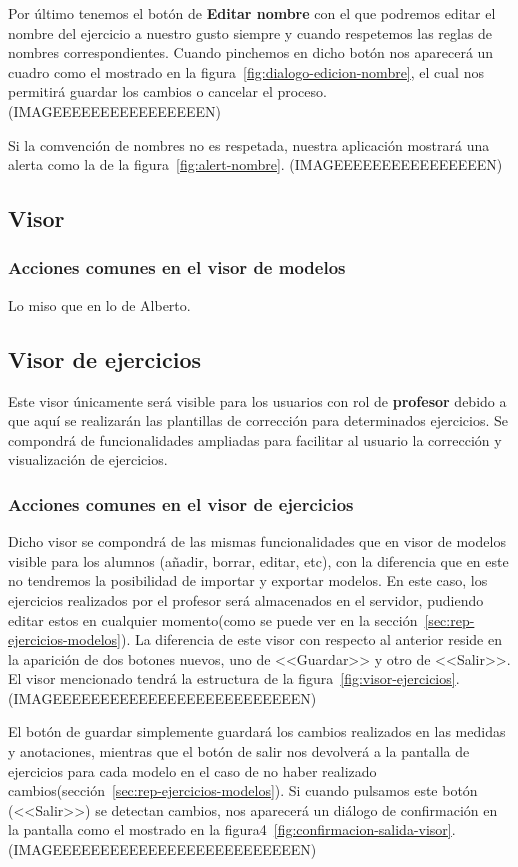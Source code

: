 Por último tenemos el botón de \textbf{Editar nombre} con el que podremos editar el nombre del ejercicio a nuestro gusto siempre y cuando respetemos las reglas de nombres correspondientes. Cuando pinchemos en dicho botón nos aparecerá un cuadro como el mostrado en la figura~\ref{fig:dialogo-edicion-nombre}, el cual nos permitirá guardar los cambios o cancelar el proceso.
(IMAGEEEEEEEEEEEEEEEEN)

Si la comvención de nombres no es respetada, nuestra aplicación mostrará una alerta como la de la figura~\ref{fig:alert-nombre}.
(IMAGEEEEEEEEEEEEEEEEN)

\subsection{Visor}
\subsubsection{Acciones comunes en el visor de modelos}
Lo miso que en lo de Alberto.

\subsection{Visor de ejercicios}\label{sec:visor-ejercicios}
Este visor únicamente será visible para los usuarios con rol de \textbf{profesor} debido a que aquí se realizarán las plantillas de corrección para determinados ejercicios. Se compondrá de funcionalidades ampliadas para facilitar al usuario la corrección y visualización de ejercicios.

\subsubsection{Acciones comunes en el visor de ejercicios}
Dicho visor se compondrá de las mismas funcionalidades que en visor de modelos visible para los alumnos (añadir, borrar, editar, etc), con la diferencia que en este no tendremos la posibilidad de importar y exportar modelos. En este caso, los ejercicios realizados por el profesor será almacenados en el servidor, pudiendo editar estos en cualquier momento(como se puede ver en la sección~\ref{sec:rep-ejercicios-modelos}). La diferencia de este visor con respecto al anterior reside en la aparición de dos botones nuevos, uno de <<Guardar>> y otro de <<Salir>>. El visor mencionado tendrá la estructura de la figura~\ref{fig:visor-ejercicios}.
(IMAGEEEEEEEEEEEEEEEEEEEEEEEEEEN)

El botón de guardar simplemente guardará los cambios realizados en las medidas y anotaciones, mientras que el botón de salir nos devolverá a la pantalla de ejercicios para cada modelo en el caso de no haber realizado cambios(sección~\ref{sec:rep-ejercicios-modelos}). Si cuando pulsamos este botón (<<Salir>>) se detectan cambios, nos aparecerá un diálogo de confirmación en la pantalla como el mostrado en la figura4~\ref{fig:confirmacion-salida-visor}.
(IMAGEEEEEEEEEEEEEEEEEEEEEEEEEEN)

